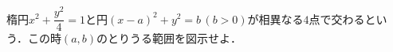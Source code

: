 \documentclass[../../main.tex]{subfiles}
\begin{document}
楕円$x^2+\dfrac{y^2}{4}=1$と円$(x-a)^2+y^2=b\, (b>0)$が相異なる$4$点で交わるという．この時$(a,b)$のとりうる範囲を図示せよ．
\end{document}

